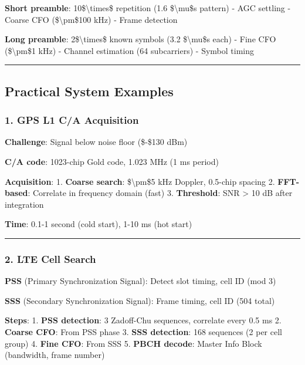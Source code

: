 \textbf{Short preamble}: 10\$\textbackslash times\$ repetition (1.6
\$\textbackslash mu\$s pattern) - AGC settling - Coarse CFO
(\$\textbackslash pm\$100 kHz) - Frame detection

\textbf{Long preamble}: 2\$\textbackslash times\$ known symbols (3.2
\$\textbackslash mu\$s each) - Fine CFO (\$\textbackslash pm\$1 kHz) -
Channel estimation (64 subcarriers) - Symbol timing

\begin{center}\rule{0.5\linewidth}{0.5pt}\end{center}

\subsection{Practical System Examples}\label{practical-system-examples}

\subsubsection{1. GPS L1 C/A Acquisition}\label{gps-l1-ca-acquisition}

\textbf{Challenge}: Signal below noise floor (\$-\$130 dBm)

\textbf{C/A code}: 1023-chip Gold code, 1.023 MHz (1 ms period)

\textbf{Acquisition}: 1. \textbf{Coarse search}: \$\textbackslash pm\$5
kHz Doppler, 0.5-chip spacing 2. \textbf{FFT-based}: Correlate in
frequency domain (fast) 3. \textbf{Threshold}: SNR \textgreater{} 10 dB
after integration

\textbf{Time}: 0.1-1 second (cold start), 1-10 ms (hot start)

\begin{center}\rule{0.5\linewidth}{0.5pt}\end{center}

\subsubsection{2. LTE Cell Search}\label{lte-cell-search}

\textbf{PSS} (Primary Synchronization Signal): Detect slot timing, cell
ID (mod 3)

\textbf{SSS} (Secondary Synchronization Signal): Frame timing, cell ID
(504 total)

\textbf{Steps}: 1. \textbf{PSS detection}: 3 Zadoff-Chu sequences,
correlate every 0.5 ms 2. \textbf{Coarse CFO}: From PSS phase 3.
\textbf{SSS detection}: 168 sequences (2 per cell group) 4. \textbf{Fine
CFO}: From SSS 5. \textbf{PBCH decode}: Master Info Block (bandwidth,
frame number)

